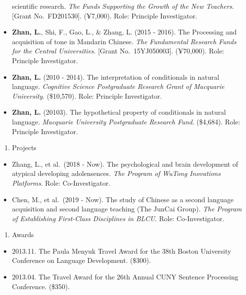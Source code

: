 \documentclass[12pt,]{article}
\providecommand{\tightlist}{%
  \setlength{\itemsep}{0pt}\setlength{\parskip}{0pt}}
\begin{document}
\begin{itemize}
  scientific research. \emph{The Funds Supporting the Growth of the New
  Teachers}. {[}Grant No.~FD201530{]}. (¥7,000). Role: Principle
  Investigator.
\item
  \textbf{Zhan, L.}, Shi, F., Gao, L., \& Zhang, L. (2015 - 2016). The
  Processing and acquisition of tone in Mandarin Chinese. \emph{The
  Fundamental Research Funds for the Central Universities}. {[}Grant
  No.~15YJ050003{]}. (¥70,000). Role: Principle Investigator.
\item
  \textbf{Zhan, L.} (2010 - 2014). The interpretation of conditionals in
  natural language. \emph{Cognitive Science Postgraduate Research Grant
  of Macquarie University}. (\$10,570). Role: Principle Investigator.
\item
  \textbf{Zhan, L.} (20103). The hypothetical property of conditionals
  in natural language. \emph{Macquarie University Postgraduate Research
  Fund}. (\$4,684). Role: Principle Investigator.
\end{itemize}

\begin{enumerate}
\def\labelenumi{\arabic{enumi}.}
\setcounter{enumi}{1}
\tightlist
\item
  Projects
\end{enumerate}

\begin{itemize}
\item
  Zhang, L., et al.~(2018 - Now). The psychological and brain
  development of atypical developing adolensences. \emph{The Program of
  WuTong Inovations Platforms}. Role: Co-Investigator.
\item
  Chen, M., et al.~(2019 - Now). The study of Chinese as a second
  language acquisition and second language teaching (The JunCai Group).
  \emph{The Program of Establishing First-Class Disciplines in BLCU}.
  Role: Co-Investigator.
\end{itemize}

\begin{enumerate}
\def\labelenumi{\arabic{enumi}.}
\setcounter{enumi}{2}
\tightlist
\item
  Awards
\end{enumerate}

\begin{itemize}
\item
  2013.11. The Paula Menyuk Travel Award for the 38th Boston University
  Conference on Language Development. (\$300).
\item
  2013.04. The Travel Award for the 26th Annual CUNY Sentence Processing
  Conference. (\$350).
\end{itemize}
\end{document}
